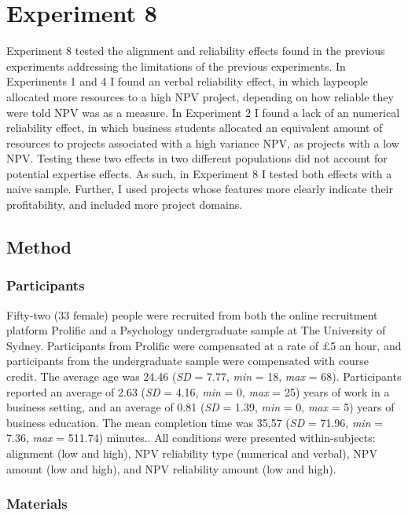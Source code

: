\documentclass[a4paper, nobind, dvipsnames]{templates/ociamthesis}
\theoremstyle{definition}
\theoremstyle{definition}
\theoremstyle{definition}
\theoremstyle{definition}
\theoremstyle{remark}
\begin{document}
\hypertarget{alignment-7}{%
\section{Experiment 8}\label{alignment-7}}

Experiment 8 tested the alignment and reliability effects found in the previous
experiments addressing the limitations of the previous experiments. In
Experiments 1 and 4 I found an verbal reliability effect, in which laypeople
allocated more resources to a high NPV project, depending on how reliable they
were told NPV was as a measure. In Experiment 2 I found a lack of an numerical
reliability effect, in which business students allocated an equivalent amount of
resources to projects associated with a high variance NPV, as projects with a
low NPV. Testing these two effects in two different populations did not account
for potential expertise effects. As such, in Experiment 8 I tested both effects
with a naive sample. Further, I used projects whose features more clearly
indicate their profitability, and included more project domains.

\subsection{Method}

\subsubsection{Participants}

Fifty-two (33 female) people were recruited from both the online recruitment platform Prolific and a Psychology undergraduate sample at The University of Sydney. Participants from Prolific were compensated at a rate of £5 an hour, and participants from the undergraduate sample were compensated with course credit. The average age was 24.46 (\emph{SD} = 7.77, \emph{min} = 18, \emph{max} = 68). Participants reported an average of 2.63 (\emph{SD} = 4.16, \emph{min} = 0, \emph{max} = 25) years of work in a business setting, and an average of 0.81 (\emph{SD} = 1.39, \emph{min} = 0, \emph{max} = 5) years of business education. The mean completion time was 35.57 (\emph{SD} = 71.96, \emph{min} = 7.36, \emph{max} = 511.74) minutes.. All conditions were presented within-subjects:
alignment (low and high), NPV reliability type (numerical and verbal), NPV
amount (low and high), and NPV reliability amount (low and high).

\subsubsection{Materials}
\end{document}
